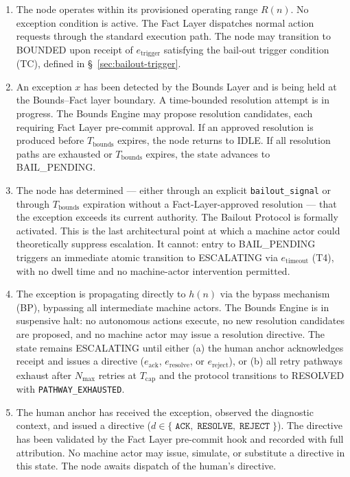 \begin{enumerate}\itemsep=0pt
\item[\textbf{IDLE.}] The node operates within its provisioned operating range $R(n)$. No exception condition is active. The Fact Layer dispatches normal action requests through the standard execution path. The node may transition to BOUNDED upon receipt of $e_{\text{trigger}}$ satisfying the bail-out trigger condition (TC), defined in \S~\ref{sec:bailout-trigger}.

\item[\textbf{BOUNDED.}] An exception $x$ has been detected by the Bounds Layer and is being held at the Bounds--Fact layer boundary. A time-bounded resolution attempt is in progress. The Bounds Engine may propose resolution candidates, each requiring Fact Layer pre-commit approval. If an approved resolution is produced before $T_{\text{bounds}}$ expires, the node returns to IDLE. If all resolution paths are exhausted or $T_{\text{bounds}}$ expires, the state advances to BAIL\_PENDING.

\item[\textbf{BAIL\_PENDING.}] The node has determined --- either through an explicit \texttt{bailout\_signal} or through $T_{\text{bounds}}$ expiration without a Fact-Layer-approved resolution --- that the exception exceeds its current authority. The Bailout Protocol is formally activated. This is the last architectural point at which a machine actor could theoretically suppress escalation. It cannot: entry to BAIL\_PENDING triggers an immediate atomic transition to ESCALATING via $e_{\text{timeout}}$ (T4), with no dwell time and no machine-actor intervention permitted.

\item[\textbf{ESCALATING.}] The exception is propagating directly to $h(n)$ via the bypass mechanism (BP), bypassing all intermediate machine actors. The Bounds Engine is in suspensive halt: no autonomous actions execute, no new resolution candidates are proposed, and no machine actor may issue a resolution directive. The state remains ESCALATING until either (a) the human anchor acknowledges receipt and issues a directive ($e_{\text{ack}}$, $e_{\text{resolve}}$, or $e_{\text{reject}}$), or (b) all retry pathways exhaust after $N_{\max}$ retries at $T_{\text{cap}}$ and the protocol transitions to RESOLVED with \texttt{PATHWAY\_EXHAUSTED}.

\item[\textbf{HUMAN\_ACKNOWLEDGED.}] The human anchor has received the exception, observed the diagnostic context, and issued a directive ($d \in \{\;\texttt{ACK},\; \texttt{RESOLVE},\; \texttt{REJECT}\;\}$). The directive has been validated by the Fact Layer pre-commit hook and recorded with full attribution. No machine actor may issue, simulate, or substitute a directive in this state. The node awaits dispatch of the human's directive.


\end{enumerate}
